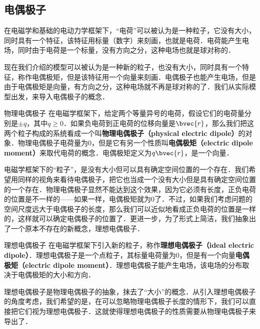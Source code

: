


\subsection{电偶极子}

在电磁学和基础的电动力学框架下，“电荷”可以被认为是一种粒子，它没有大小，同时具有一个特征，该特征用标量（数字）来刻画，也就是电荷．电荷能产生电场，同时由于电荷是一个标量，没有方向之分，这种电场也就是球对称的．

现在我们介绍的模型可以被认为是一种新的粒子，也没有大小，同时具有一个特征，称作电偶极矩，但是该特征用一个向量来刻画．电偶极子也能产生电场，但是由于电偶极矩是向量，有方向之分，这种电场就不再是球对称的了．我们从实际模型出发，来导入电偶极子的概念．

\begin{definition}{物理电偶极子}
在电磁学框架下，给定两个等量异号的电荷，假设它们的电荷量分别是$\pm q$，其中$q\geq 0$．如果负电荷到正电荷的位移向量是$\bvec{r}$，那么我们把这两个粒子构成的系统看成一个叫\textbf{物理电偶极子（physical electric dipole）}的对象．物理电偶极子电荷量为$0$，但是它有另一个性质叫\textbf{电偶极矩（electric dipole moment）}来取代电荷的概念．电偶极矩定义为$q\bvec{r}$，是一个向量．
\end{definition}

电磁学框架下的“粒子”，是没有大小但可以具有确定空间位置的一个存在．我们希望用同样的视角来看待电偶极子，把它也当成一个没有大小但是具有确定空间位置的一个存在．物理电偶极子显然不能达到这个效果，因为它必须有长度，正负电荷的位置是不一样的——如果一样，电偶极矩就为$0$了．不过，如果我们考虑问题的空间尺度远大于电偶极子的长度，那么我们可以近似地看成正负电荷的位置是一样的，这样就可以确定电偶极子的位置了．更进一步，为了形式上简洁，我们抽象出了一个原本不存在的新概念，理想电偶极子．

\begin{definition}{理想电偶极子}
在电磁学框架下引入新的粒子，称作\textbf{理想电偶极子（ideal electric dipole）}．理想电偶极子是一个点粒子，其标量电荷量为$0$，但是有一个向量\textbf{电偶极矩（electric dipole moment）}．理想电偶极子能产生电场，该电场的分布取决于电偶极矩的大小和方向．
\end{definition}

理想电偶极子是物理电偶极子的抽象，抹去了“大小”的概念．从引入理想电偶极子的角度考虑，我们希望的是，在可以忽略物理电偶极子长度的情形下，我们可以直接把它们视为理想电偶极子．这就使得理想电偶极子的性质需要从物理电偶极子来导出了．

